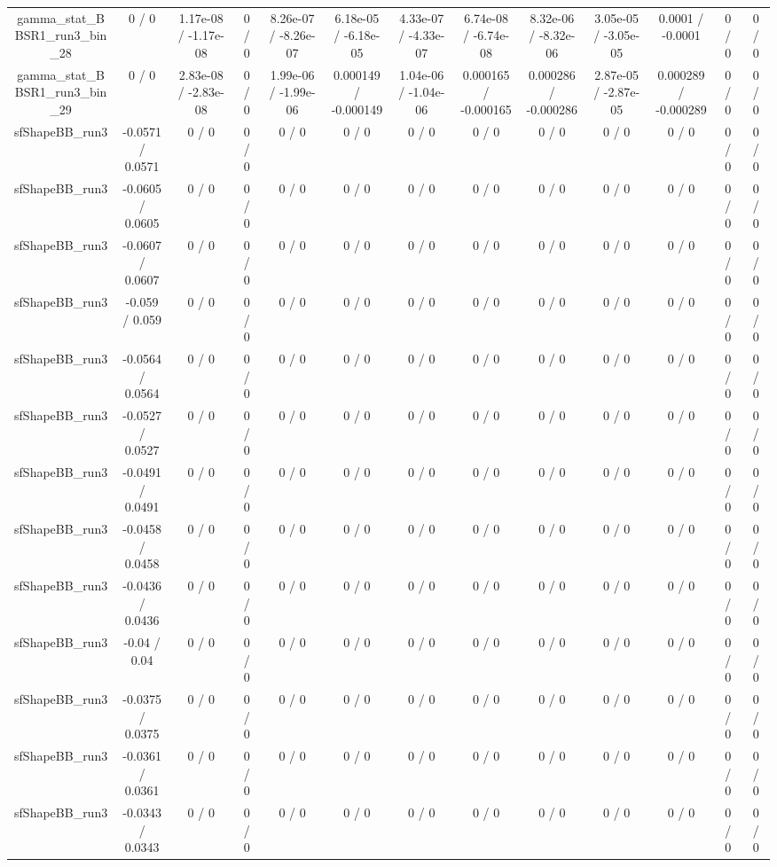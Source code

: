 \documentclass[10pt]{article}
\begin{document}
\begin{table}[htbp]
\begin{center}
\begin{tabular}{|c|c|c|c|c|c|c|c|c|c|c|c|c|}
  gamma_stat_BBSR1_run3_bin_28 & 0 / 0 & 1.17e-08 / -1.17e-08 & 0 / 0 & 8.26e-07 / -8.26e-07 & 6.18e-05 / -6.18e-05 & 4.33e-07 / -4.33e-07 & 6.74e-08 / -6.74e-08 & 8.32e-06 / -8.32e-06 & 3.05e-05 / -3.05e-05 & 0.0001 / -0.0001 & 0 / 0 & 0 / 0 \\ 
  gamma_stat_BBSR1_run3_bin_29 & 0 / 0 & 2.83e-08 / -2.83e-08 & 0 / 0 & 1.99e-06 / -1.99e-06 & 0.000149 / -0.000149 & 1.04e-06 / -1.04e-06 & 0.000165 / -0.000165 & 0.000286 / -0.000286 & 2.87e-05 / -2.87e-05 & 0.000289 / -0.000289 & 0 / 0 & 0 / 0 \\ 
  sfShapeBB_run3 & -0.0571 / 0.0571 & 0 / 0 & 0 / 0 & 0 / 0 & 0 / 0 & 0 / 0 & 0 / 0 & 0 / 0 & 0 / 0 & 0 / 0 & 0 / 0 & 0 / 0 \\ 
  sfShapeBB_run3 & -0.0605 / 0.0605 & 0 / 0 & 0 / 0 & 0 / 0 & 0 / 0 & 0 / 0 & 0 / 0 & 0 / 0 & 0 / 0 & 0 / 0 & 0 / 0 & 0 / 0 \\ 
  sfShapeBB_run3 & -0.0607 / 0.0607 & 0 / 0 & 0 / 0 & 0 / 0 & 0 / 0 & 0 / 0 & 0 / 0 & 0 / 0 & 0 / 0 & 0 / 0 & 0 / 0 & 0 / 0 \\ 
  sfShapeBB_run3 & -0.059 / 0.059 & 0 / 0 & 0 / 0 & 0 / 0 & 0 / 0 & 0 / 0 & 0 / 0 & 0 / 0 & 0 / 0 & 0 / 0 & 0 / 0 & 0 / 0 \\ 
  sfShapeBB_run3 & -0.0564 / 0.0564 & 0 / 0 & 0 / 0 & 0 / 0 & 0 / 0 & 0 / 0 & 0 / 0 & 0 / 0 & 0 / 0 & 0 / 0 & 0 / 0 & 0 / 0 \\ 
  sfShapeBB_run3 & -0.0527 / 0.0527 & 0 / 0 & 0 / 0 & 0 / 0 & 0 / 0 & 0 / 0 & 0 / 0 & 0 / 0 & 0 / 0 & 0 / 0 & 0 / 0 & 0 / 0 \\ 
  sfShapeBB_run3 & -0.0491 / 0.0491 & 0 / 0 & 0 / 0 & 0 / 0 & 0 / 0 & 0 / 0 & 0 / 0 & 0 / 0 & 0 / 0 & 0 / 0 & 0 / 0 & 0 / 0 \\ 
  sfShapeBB_run3 & -0.0458 / 0.0458 & 0 / 0 & 0 / 0 & 0 / 0 & 0 / 0 & 0 / 0 & 0 / 0 & 0 / 0 & 0 / 0 & 0 / 0 & 0 / 0 & 0 / 0 \\ 
  sfShapeBB_run3 & -0.0436 / 0.0436 & 0 / 0 & 0 / 0 & 0 / 0 & 0 / 0 & 0 / 0 & 0 / 0 & 0 / 0 & 0 / 0 & 0 / 0 & 0 / 0 & 0 / 0 \\ 
  sfShapeBB_run3 & -0.04 / 0.04 & 0 / 0 & 0 / 0 & 0 / 0 & 0 / 0 & 0 / 0 & 0 / 0 & 0 / 0 & 0 / 0 & 0 / 0 & 0 / 0 & 0 / 0 \\ 
  sfShapeBB_run3 & -0.0375 / 0.0375 & 0 / 0 & 0 / 0 & 0 / 0 & 0 / 0 & 0 / 0 & 0 / 0 & 0 / 0 & 0 / 0 & 0 / 0 & 0 / 0 & 0 / 0 \\ 
  sfShapeBB_run3 & -0.0361 / 0.0361 & 0 / 0 & 0 / 0 & 0 / 0 & 0 / 0 & 0 / 0 & 0 / 0 & 0 / 0 & 0 / 0 & 0 / 0 & 0 / 0 & 0 / 0 \\ 
  sfShapeBB_run3 & -0.0343 / 0.0343 & 0 / 0 & 0 / 0 & 0 / 0 & 0 / 0 & 0 / 0 & 0 / 0 & 0 / 0 & 0 / 0 & 0 / 0 & 0 / 0 & 0 / 0 \\ 

\end{tabular}
\end{center}
\end{table}
\end{document}

